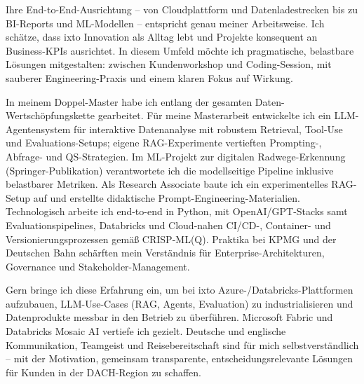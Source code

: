 Ihre End-to-End-Ausrichtung – von Cloudplattform und Datenladestrecken bis zu BI-Reports und ML-Modellen – entspricht genau meiner Arbeitsweise. Ich schätze, dass ixto Innovation als Alltag lebt und Projekte konsequent an Business-KPIs ausrichtet. In diesem Umfeld möchte ich pragmatische, belastbare Lösungen mitgestalten: zwischen Kundenworkshop und Coding-Session, mit sauberer Engineering-Praxis und einem klaren Fokus auf Wirkung.

In meinem Doppel-Master habe ich entlang der gesamten Daten-Wertschöpfungskette gearbeitet. Für meine Masterarbeit entwickelte ich ein LLM-Agentensystem für interaktive Datenanalyse mit robustem Retrieval, Tool-Use und Evaluations-Setups; eigene RAG-Experimente vertieften Prompting-, Abfrage- und QS-Strategien. Im ML-Projekt zur digitalen Radwege-Erkennung (Springer-Publikation) verantwortete ich die modellseitige Pipeline inklusive belastbarer Metriken. Als Research Associate baute ich ein experimentelles RAG-Setup auf und erstellte didaktische Prompt-Engineering-Materialien. Technologisch arbeite ich end-to-end in Python, mit OpenAI/GPT-Stacks samt Evaluationspipelines, Databricks und Cloud-nahen CI/CD-, Container- und Versionierungsprozessen gemäß CRISP-ML(Q). Praktika bei KPMG und der Deutschen Bahn schärften mein Verständnis für Enterprise-Architekturen, Governance und Stakeholder-Management.

Gern bringe ich diese Erfahrung ein, um bei ixto Azure-/Databricks-Plattformen aufzubauen, LLM-Use-Cases (RAG, Agents, Evaluation) zu industrialisieren und Datenprodukte messbar in den Betrieb zu überführen. Microsoft Fabric und Databricks Mosaic AI vertiefe ich gezielt. Deutsche und englische Kommunikation, Teamgeist und Reisebereitschaft sind für mich selbstverständlich – mit der Motivation, gemeinsam transparente, entscheidungsrelevante Lösungen für Kunden in der DACH-Region zu schaffen.